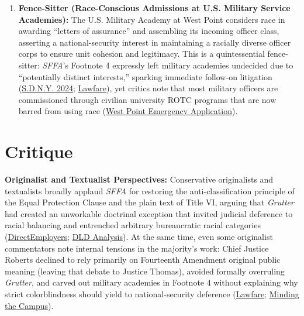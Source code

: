 \documentclass[12pt]{article}
\begin{document}
\begin{enumerate}
\item \textbf{Fence-Sitter (Race-Conscious Admissions at U.S. Military Service Academies):} The U.S. Military Academy at West Point considers race in awarding ``letters of assurance'' and assembling its incoming officer class, asserting a national-security interest in maintaining a racially diverse officer corps to ensure unit cohesion and legitimacy. This is a quintessential fence-sitter: \textit{SFFA}'s Footnote 4 expressly left military academies undecided due to ``potentially distinct interests,'' sparking immediate follow-on litigation (\href{https://law.justia.com/cases/federal/district-courts/new-york/nysdce/7:2023cv08262/606600/78/}{S.D.N.Y. 2024}; \href{https://www.lawfaremedia.org/article/the-national-security-footnote-in-the-affirmative-action-decision}{Lawfare}), yet critics note that most military officers are commissioned through civilian university ROTC programs that are now barred from using race (\href{https://www.supremecourt.gov/DocketPDF/23/23A696/298928/20240126173859280_Army\%20SCOTUS\%20App.pdf}{West Point Emergency Application}).
\end{enumerate}

\section{Critique}

\textbf{Originalist and Textualist Perspectives:} Conservative originalists and textualists broadly applaud \textit{SFFA} for restoring the anti-classification principle of the Equal Protection Clause and the plain text of Title VI, arguing that \textit{Grutter} had created an unworkable doctrinal exception that invited judicial deference to racial balancing and entrenched arbitrary bureaucratic racial categories (\href{https://directemployers.org/2023/07/03/scotus-ends-its-45-year-detour-around-the-equal-protection-clause-by-now-finding-race-based-admissions-practices-at-harvard-and-unc-unlawful/}{DirectEmployers}; \href{https://dldlawyers.com/justice-clarence-thomas-on-affirmative-action-and-equal-protection-under-the-law/}{DLD Analysis}). At the same time, even some originalist commentators note internal tensions in the majority's work: Chief Justice Roberts declined to rely primarily on Fourteenth Amendment original public meaning (leaving that debate to Justice Thomas), avoided formally overruling \textit{Grutter}, and carved out military academies in Footnote 4 without explaining why strict colorblindness should yield to national-security deference (\href{https://www.lawfaremedia.org/article/the-national-security-footnote-in-the-affirmative-action-decision}{Lawfare}; \href{https://mindingthecampus.org/2023/07/14/sffa-v-harvard-should-our-nations-service-academies-be-exempt-from-this-landmark-ruling/}{Minding the Campus}).
\end{document}
